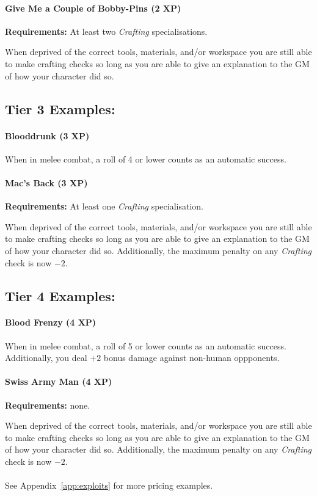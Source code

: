 \paragraph{Give Me a Couple of Bobby-Pins (2 XP)}
\textbf{Requirements:} At least two \textit{Crafting} specialisations.

When deprived of the correct tools, materials, and/or workspace you are still able to make crafting checks so long as you are able to give an explanation to the GM of how your character did so.

\subsection{Tier 3 Examples:}
\paragraph{Blooddrunk (3 XP)}
When in melee combat, a roll of 4 or lower counts as an automatic success.

\paragraph{Mac's Back (3 XP)}
\textbf{Requirements:} At least one \textit{Crafting} specialisation.

When deprived of the correct tools, materials, and/or workspace you are still able to make crafting checks so long as you are able to give an explanation to the GM of how your character did so.
Additionally, the maximum penalty on any \textit{Crafting} check is now $-2$.

\subsection{Tier 4 Examples:}

\paragraph{Blood Frenzy (4 XP)}
When in melee combat, a roll of 5 or lower counts as an automatic success.
Additionally, you deal $+2$ bonus damage against non-human oppponents.

\paragraph{Swiss Army Man (4 XP)}
\textbf{Requirements:} none.

When deprived of the correct tools, materials, and/or workspace you are still able to make crafting checks so long as you are able to give an explanation to the GM of how your character did so.
Additionally, the maximum penalty on any \textit{Crafting} check is now $-2$.
\\\\See Appendix~\ref{app:exploits} for more pricing examples.

